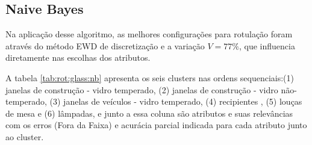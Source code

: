\subsection{Naive Bayes} \label{cap:resultados:ssec:glass:nb}

 

Na aplicação desse algoritmo, as melhores configurações para rotulação foram através do método EWD de discretização e a variação  ${V=77\%}$, que influencia diretamente nas escolhas dos atributos. 

 A tabela \ref{tab:rot:glass:nb}  apresenta os seis clusters nas ordens sequenciais:(1) janelas de construção - vidro temperado, (2) janelas de construção - vidro não-temperado, (3) janelas de veículos - vidro temperado, (4) recipientes , (5) louças de mesa e (6) lâmpadas, e junto a essa coluna são atributos e suas relevâncias com os erros (Fora da Faixa) e acurácia parcial indicada para cada atributo junto ao cluster. 
 
